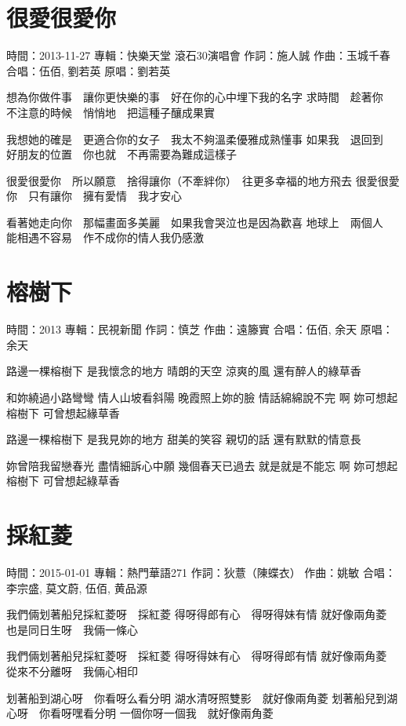 \documentclass[UTF8,a4paper,oneside,twocolumn,12pt]{ctexbook}
\newcommand{\infopair}[2]{\textbullet #1：#2}
\newcommand{\zc}[1][伍佰]{\infopair{作詞}{#1}}
\newcommand{\zq}[1][伍佰]{\infopair{作曲}{#1}}
\newcommand{\zj}[1]{\infopair{專輯}{#1}}
\newcommand{\yc}[1]{\infopair{原唱}{#1}}
\newcommand{\sj}[1]{\infopair{時間}{#1}}
\newenvironment{info}{\begin{flushleft}\kaishu
	}
	{\end{flushleft}\normalsize\yahei\par}
\newenvironment{lyric}{
	}
{}
\begin{document}
\section{很愛很愛你}
\begin{info}
	\sj{2013-11-27}
	\zj{快樂天堂 滾石30演唱會}
	\zc[施人誠]
	\zq[玉城千春]
	\infopair{合唱}{伍佰, 劉若英}
	\yc{劉若英}
\end{info}
\begin{lyric}
	想為你做件事　讓你更快樂的事　好在你的心中埋下我的名字
	求時間　趁著你　不注意的時候　悄悄地　把這種子釀成果實

	我想她的確是　更適合你的女子　我太不夠溫柔優雅成熟懂事
	如果我　退回到　好朋友的位置　你也就　不再需要為難成這樣子

	很愛很愛你　所以願意　捨得讓你（不牽絆你）　往更多幸福的地方飛去
	很愛很愛你　只有讓你　擁有愛情　我才安心

	看著她走向你　那幅畫面多美麗　如果我會哭泣也是因為歡喜
	地球上　兩個人　能相遇不容易　作不成你的情人我仍感激
\end{lyric}

\section{榕樹下}%
\begin{info}
	\sj{2013}
	\zj{民視新聞}
	\zc[慎芝]
	\zq[遠籐實]
	\infopair{合唱}{伍佰, 余天}
	\yc{余天}
\end{info}
\begin{lyric}
	路邊一棵榕樹下 是我懷念的地方
	晴朗的天空 涼爽的風 還有醉人的綠草香

	和妳繞過小路彎彎 情人山坡看斜陽
	晚霞照上妳的臉 情話綿綿說不完 啊
	妳可想起榕樹下 可曾想起緣草香

	路邊一棵榕樹下 是我見妳的地方
	甜美的笑容 親切的話 還有默默的情意長

	妳曾陪我留戀春光 盡情細訴心中願
	幾個春天已過去 就是就是不能忘
	啊 妳可想起榕樹下 可曾想起綠草香
\end{lyric}

\section{採紅菱}
\begin{info}
	\sj{2015-01-01}
	\zj{熱門華語271}
	\zc[狄薏（陳蝶衣）]
	\zq[姚敏]
	\infopair{合唱}{李宗盛, 莫文蔚, 伍佰, 黄品源}
\end{info}
\begin{lyric}
	我們倆划著船兒採紅菱呀　採紅菱
	得呀得郎有心　得呀得妹有情
	就好像兩角菱　也是同日生呀　我倆一條心

	我們倆划著船兒採紅菱呀　採紅菱
	得呀得妹有心　得呀得郎有情
	就好像兩角菱　從來不分離呀　我倆心相印

	划著船到湖心呀　你看呀么看分明
	湖水清呀照雙影　就好像兩角菱
	划著船兒到湖心呀　你看呀嘿看分明
	一個你呀一個我　就好像兩角菱
\end{lyric}
\end{document}
